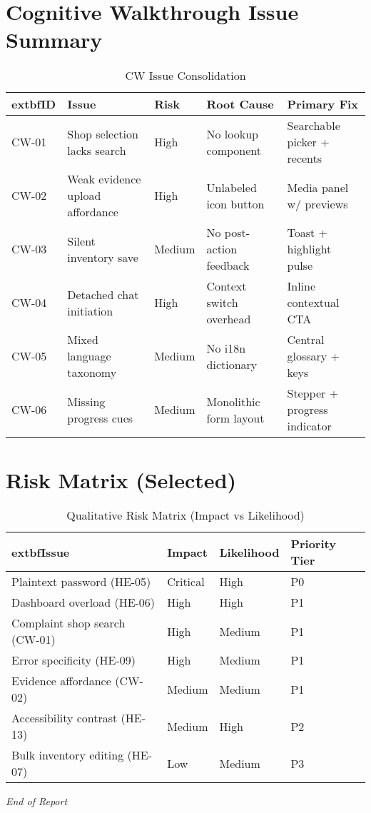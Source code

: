 \documentclass[11pt,a4paper]{article}
\begin{document}
\section{Cognitive Walkthrough Issue Summary}
\begin{table}[h]
	\centering
	\caption{CW Issue Consolidation}
	\begin{tabular}{|p{1.1cm}|p{3.3cm}|p{1.5cm}|p{4.4cm}|p{4.2cm}|}
		\hline
			extbf{ID} & \textbf{Issue} & \textbf{Risk} & \textbf{Root Cause} & \textbf{Primary Fix} \\
		\hline
		CW-01 & Shop selection lacks search & High & No lookup component & Searchable picker + recents \\
		\hline
		CW-02 & Weak evidence upload affordance & High & Unlabeled icon button & Media panel w/ previews \\
		\hline
		CW-03 & Silent inventory save & Medium & No post-action feedback & Toast + highlight pulse \\
		\hline
		CW-04 & Detached chat initiation & High & Context switch overhead & Inline contextual CTA \\
		\hline
		CW-05 & Mixed language taxonomy & Medium & No i18n dictionary & Central glossary + keys \\
		\hline
		CW-06 & Missing progress cues & Medium & Monolithic form layout & Stepper + progress indicator \\
		\hline
	\end{tabular}
\end{table}

\section{Risk Matrix (Selected)}
\begin{table}[h]
	\centering
	\caption{Qualitative Risk Matrix (Impact vs Likelihood)}
	\begin{tabular}{|p{5.1cm}|p{1.9cm}|p{2.1cm}|p{2.1cm}|}
		\hline
			extbf{Issue} & \textbf{Impact} & \textbf{Likelihood} & \textbf{Priority Tier} \\
		\hline
		Plaintext password (HE-05) & Critical & High & P0 \\
		\hline
		Dashboard overload (HE-06) & High & High & P1 \\
		\hline
		Complaint shop search (CW-01) & High & Medium & P1 \\
		\hline
		Error specificity (HE-09) & High & Medium & P1 \\
		\hline
		Evidence affordance (CW-02) & Medium & Medium & P1 \\
		\hline
		Accessibility contrast (HE-13) & Medium & High & P2 \\
		\hline
		Bulk inventory editing (HE-07) & Low & Medium & P3 \\
		\hline
	\end{tabular}
\end{table}

\vfill
\begin{center}
\textit{End of Report}
\end{center}
\end{document}
